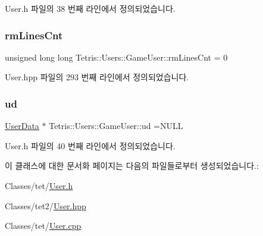 User.\+h 파일의 38 번째 라인에서 정의되었습니다.

\mbox{\label{class_tetris_1_1_users_1_1_game_user_ac5857cc9f0318a8dfbcf551424ccf8f3}} 
\subsubsection{\texorpdfstring{rm\+Lines\+Cnt}{rmLinesCnt}}
{\footnotesize\ttfamily unsigned long long Tetris\+::\+Users\+::\+Game\+User\+::rm\+Lines\+Cnt = 0\hspace{0.3cm}{\ttfamily [private]}}



User.\+hpp 파일의 293 번째 라인에서 정의되었습니다.

\mbox{\label{class_tetris_1_1_users_1_1_game_user_ac1f44d636258caa01f3041408d235289}} 
\subsubsection{\texorpdfstring{ud}{ud}}
{\footnotesize\ttfamily \hyperlink{class_tetris_1_1_users_1_1_user_data}{User\+Data} $\ast$ Tetris\+::\+Users\+::\+Game\+User\+::ud =N\+U\+LL\hspace{0.3cm}{\ttfamily [private]}}



User.\+h 파일의 40 번째 라인에서 정의되었습니다.



이 클래스에 대한 문서화 페이지는 다음의 파일들로부터 생성되었습니다.\+:\begin{DoxyCompactItemize}
\item 
Classes/tet/\hyperlink{_user_8h}{User.\+h}\item 
Classes/tet2/\hyperlink{_user_8hpp}{User.\+hpp}\item 
Classes/tet/\hyperlink{_user_8cpp}{User.\+cpp}\end{DoxyCompactItemize}

